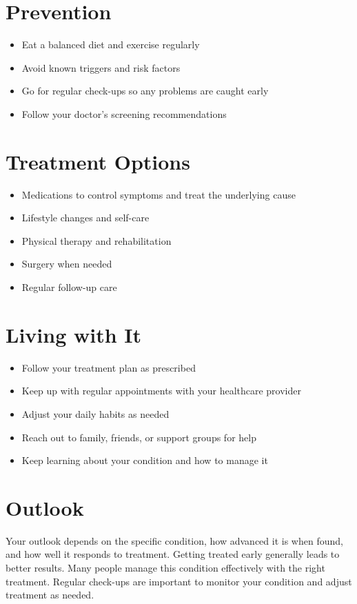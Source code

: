 \section{Prevention}

\begin{itemize}[noitemsep]
  \item Eat a balanced diet and exercise regularly
  \item Avoid known triggers and risk factors
  \item Go for regular check-ups so any problems are caught early
  \item Follow your doctor's screening recommendations
\end{itemize}

\section{Treatment Options}

\begin{itemize}[noitemsep]
  \item Medications to control symptoms and treat the underlying cause
  \item Lifestyle changes and self-care
  \item Physical therapy and rehabilitation
  \item Surgery when needed
  \item Regular follow-up care
\end{itemize}

\section{Living with It}

\begin{itemize}[noitemsep]
  \item Follow your treatment plan as prescribed
  \item Keep up with regular appointments with your healthcare provider
  \item Adjust your daily habits as needed
  \item Reach out to family, friends, or support groups for help
  \item Keep learning about your condition and how to manage it
\end{itemize}

\section{Outlook}
Your outlook depends on the specific condition, how advanced it is when found, and how well it responds to treatment. Getting treated early generally leads to better results. Many people manage this condition effectively with the right treatment. Regular check-ups are important to monitor your condition and adjust treatment as needed.
